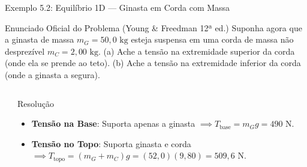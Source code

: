 \documentclass[10pt,aspectratio=169]{beamer}
\begin{document}
\begin{frame}{Exemplo 5.2: Equilíbrio 1D --- Ginasta em Corda com Massa}
    \begin{block}{Enunciado Oficial do Problema (Young \& Freedman 12ª ed.)}
        \small
        Suponha agora que a ginasta de massa $m_G = 50{,}0\text{ kg}$ esteja suspensa em uma corda de massa não desprezível $m_C = 2{,}00\text{ kg}$. (a) Ache a tensão na extremidade superior da corda (onde ela se prende ao teto). (b) Ache a tensão na extremidade inferior da corda (onde a ginasta a segura).
    \end{block}
    \begin{columns}[T]
        \begin{center}
        \end{center}
        \begin{exampleblock}{Resolução}
            \small
            \begin{itemize}\setlength{\itemsep}{3pt}
                \item \textbf{Tensão na Base}: Suporta apenas a ginasta $\implies T_{\text{base}} = m_G g = 490\text{ N}$.
                \item \textbf{Tensão no Topo}: Suporta ginasta e corda $\implies T_{\text{topo}} = (m_G + m_C)g = (52{,}0)(9{,}80) = 509{,}6\text{ N}$.
            \end{itemize}
        \end{exampleblock}
    \end{columns}
\end{frame}
\end{document}
